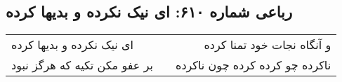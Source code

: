 \begin{center}
\section*{رباعی شماره ۶۱۰: ای نیک نکرده و بدیها کرده}
\label{sec:sh610}
\begin{longtable}{l p{0.5cm} r}
ای نیک نکرده و بدیها کرده
&&
و آنگاه نجات خود تمنا کرده
\\
بر عفو مکن تکیه که هرگز نبود
&&
ناکرده چو کرده کرده چون ناکرده
\\
\end{longtable}
\end{center}
